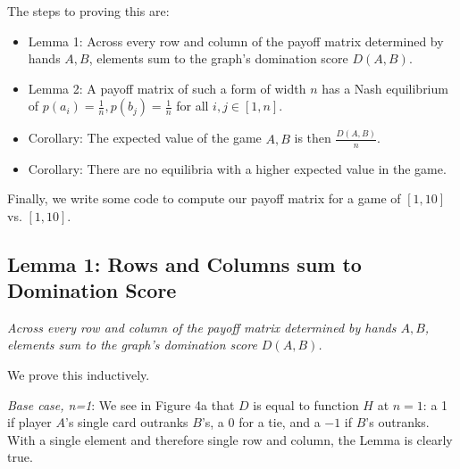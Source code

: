 \documentclass[11pt, oneside]{article} 	%
\begin{document}
The steps to proving this are:

\begin{itemize}
\item Lemma 1: Across every row and column of the payoff matrix determined by hands $A, B$, elements sum to the graph's domination score $D(A,B)$.
\item Lemma 2: A payoff matrix of such a form of width $n$ has a Nash equilibrium of $p(a_i) = \frac{1}{n}, p(b_j) = \frac{1}{n}$ for all $i, j \in [1,n]$.
\item Corollary: The expected value of the game $A, B$ is then $\frac{D(A,B)}{n}$.
\item Corollary: There are no equilibria with a higher expected value in the game.
\end{itemize}

Finally, we write some code to compute our payoff matrix for a game of $[1,10]$ vs. $[1,10]$.

\subsection{Lemma 1: Rows and Columns sum to Domination Score}

\emph{Across every row and column of the payoff matrix determined by hands $A, B$, elements sum to the graph's domination score $D(A,B)$.}

We prove this inductively.

\emph{Base case, n=1}: We see in Figure 4a that $D$ is equal to function $H$ at $n=1$: a 1 if player $A$'s single card outranks $B$'s, a 0 for a tie, and a $-1$ if $B$'s outranks.  With a single element and therefore single row and column, the Lemma is clearly true.

\end{document}
